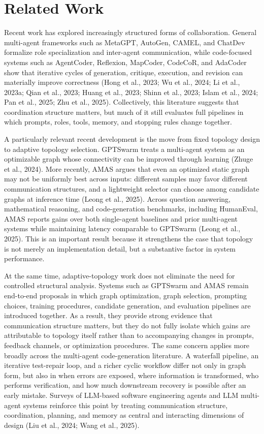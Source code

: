 \documentclass[manuscript,screen,review]{acmart}
\begin{document}
\section{Related Work}

Recent work has explored increasingly structured forms of collaboration. General multi-agent frameworks such as MetaGPT, AutoGen, CAMEL, and ChatDev formalize role specialization and inter-agent communication, while code-focused systems such as AgentCoder, Reflexion, MapCoder, CodeCoR, and AdaCoder show that iterative cycles of generation, critique, execution, and revision can materially improve correctness (Hong et al., 2023; Wu et al., 2024; Li et al., 2023a; Qian et al., 2023; Huang et al., 2023; Shinn et al., 2023; Islam et al., 2024; Pan et al., 2025; Zhu et al., 2025). Collectively, this literature suggests that coordination structure matters, but much of it still evaluates full pipelines in which prompts, roles, tools, memory, and stopping rules change together.

A particularly relevant recent development is the move from fixed topology design to adaptive topology selection. GPTSwarm treats a multi-agent system as an optimizable graph whose connectivity can be improved through learning (Zhuge et al., 2024). More recently, AMAS argues that even an optimized static graph may not be uniformly best across inputs: different samples may favor different communication structures, and a lightweight selector can choose among candidate graphs at inference time (Leong et al., 2025). Across question answering, mathematical reasoning, and code-generation benchmarks, including HumanEval, AMAS reports gains over both single-agent baselines and prior multi-agent systems while maintaining latency comparable to GPTSwarm (Leong et al., 2025). This is an important result because it strengthens the case that topology is not merely an implementation detail, but a substantive factor in system performance.

At the same time, adaptive-topology work does not eliminate the need for controlled structural analysis. Systems such as GPTSwarm and AMAS remain end-to-end proposals in which graph optimization, graph selection, prompting choices, training procedures, candidate generation, and evaluation pipelines are introduced together. As a result, they provide strong evidence that communication structure matters, but they do not fully isolate which gains are attributable to topology itself rather than to accompanying changes in prompts, feedback channels, or optimization procedures. The same concern applies more broadly across the multi-agent code-generation literature. A waterfall pipeline, an iterative test-repair loop, and a richer cyclic workflow differ not only in graph form, but also in when errors are exposed, where information is transformed, who performs verification, and how much downstream recovery is possible after an early mistake. Surveys of LLM-based software engineering agents and LLM multi-agent systems reinforce this point by treating communication structure, coordination, planning, and memory as central and interacting dimensions of design (Liu et al., 2024; Wang et al., 2025).
\end{document}
